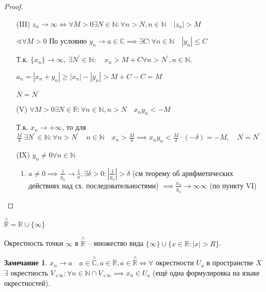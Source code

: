 \documentclass{book}
\newcommand\N{\ensuremath{\mathbb{N}}}
\newcommand\R{\ensuremath{\mathbb{R}}}
\renewcommand\C{\ensuremath{\mathbb{C}}}
\newcommand{\p}[1]{#1^{\prime}}
\newcommand{\ov}[1]{\overline{#1}}
\theoremstyle{definition}
\newtheorem*{note}{Замечание}
\begin{document}
    \begin{proof}
        \begin{itemize}
            \item [(III)] $z_n\to \infty  \iff  \forall M>0 \exists N\in \N : \forall n>N, n\in \N \quad |z_n|>M$

            $\sphericalangle \forall M>0$ По условию $y_{n} \to a\in \C \implies  \exists C: \forall n\in \N \quad |y_{n} |\leqslant C$

            Т.к. $\{x_{n} \} \to \infty,\ \exists \p N\in \N :\quad x_{n} > M+C \forall n>\p N, n\in \N$.

            $a_n = |x_{n} +y_{n} | \geqslant  |x_{n} | - |y_{n} | >M+C-C = M$

            $N = \p N$
            \item [(V)] $\forall M>0 \exists N\in \R: \forall n\in \N , n>N\quad x_{n} y_{n} <-M$

            Т.к. $x_{n} \to +\infty $, то для  $\frac{M}{\delta}\ \exists \p N\in \N : \forall n>\p N\quad n\in \N \quad x_{n} >\frac{M}{\delta} \implies  x_{n}y_{n} <\frac{M}{\delta}\cdot (-\delta) = -M, \quad N = \p N$ 
            \item[(IX)] $y_{n} \neq 0 \forall n\in \N $
                \begin{enumerate}
                    \item $a\neq 0 \implies \frac{1}{y_{n} }\to \frac{1}{a}, \exists \delta >0: \left| \frac{1}{y_{n} } \right| >\delta$ (см теорему об арифметических действиях над сх. последовательностями) $\implies \frac{x_{n} }{y_{n} } \to \infty \infty $ (по пункту VI)
                \end{enumerate}
        \end{itemize}
    \end{proof}

    $\overset{\land}{\R} = \R\cup \{\infty \}$

    Окрестность точки $\infty $ в $\overset{\land}{\R}$ -- множество вида $\{\infty \}\cup \{x\in \R:|x|>R\}$.

    \begin{note}
        $x_{n} \to a\quad a\in \overset{\land}{\C}, a\in \ov{\R}, a\in \overset{\land}{\R} \iff  \forall $ окрестности $U_a$ в пространстве $X$ $\exists $ окрестность $V_{+\infty }: \forall n\in \N \cap V_{+\infty} \implies  x_{n} \in U_a$ (ещё одна формулировка на языке окрестностей).
    \end{note}
\end{document}
